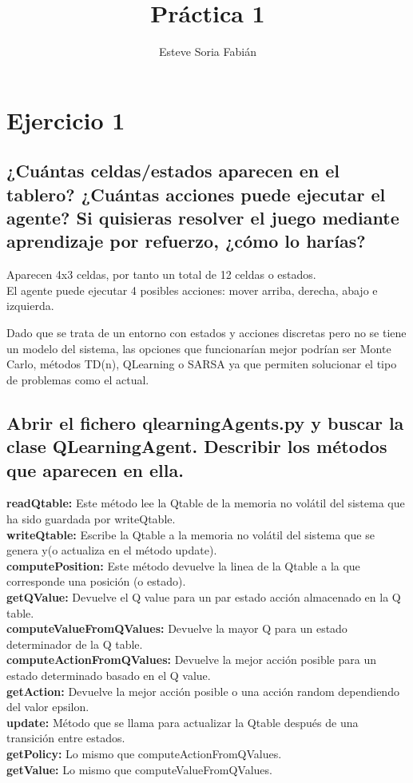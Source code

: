 \documentclass[12pt]{article}
\title{Práctica 1}
\author{Esteve Soria Fabián}
\begin{document}
    \maketitle

    \section*{Ejercicio 1}
    \subsection{¿Cuántas celdas/estados aparecen en el tablero?
    ¿Cuántas acciones puede ejecutar el agente?
    Si quisieras resolver el juego mediante aprendizaje por refuerzo, ¿cómo lo harías?}

    Aparecen 4x3 celdas, por tanto un total de 12 celdas o estados. \\
    El agente puede ejecutar 4 posibles acciones: mover arriba, derecha, abajo e izquierda.

    Dado que se trata de un entorno con estados y acciones discretas pero no se tiene un modelo del sistema, las
    opciones que funcionarían mejor podrían ser Monte Carlo, métodos TD(n), QLearning o SARSA ya que permiten
    solucionar el tipo de problemas como el actual.
    
    \subsection{Abrir el fichero qlearningAgents.py y buscar la clase QLearningAgent. Describir los métodos que
    aparecen en ella.}
    
    \textbf{readQtable:} Este método lee la Qtable de la memoria no volátil del sistema que ha sido guardada por
    writeQtable. \\
    \textbf{writeQtable:} Escribe la Qtable a la memoria no volátil del sistema que se genera y(o actualiza en el
    método update).  \\
    \textbf{computePosition:} Este método devuelve la linea de la Qtable a la que corresponde una posición (o estado).\\
    \textbf{getQValue:} Devuelve el Q value para un par estado acción almacenado en la Q table. \\
    \textbf{computeValueFromQValues:} Devuelve la mayor Q para un estado determinador de la Q table. \\
    \textbf{computeActionFromQValues:} Devuelve la mejor acción posible para un estado determinado basado en el Q
    value. \\
    \textbf{getAction:} Devuelve la mejor acción posible o una acción random dependiendo del valor epsilon. \\
    \textbf{update:} Método que se llama para actualizar la Qtable después de una transición entre estados. \\
    \textbf{getPolicy:}  Lo mismo que computeActionFromQValues. \\
    \textbf{getValue:} Lo mismo que computeValueFromQValues. \\
\end{document}
